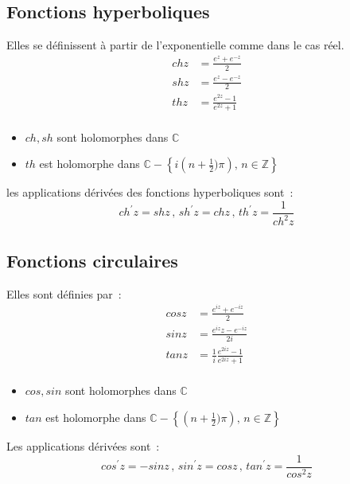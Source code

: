 \subsection{Fonctions hyperboliques}
Elles se définissent à partir de l'exponentielle comme dans le cas
réel.
\begin{align*}
ch z &= \frac{e^z + e^{-z}}{2} \\
sh z &= \frac{e^z - e^{-z}}{2} \\
th z &= \frac{e^{2z} - 1}{e^{2z} + 1} \\
\end{align*}
\begin{itemize}
\item $ch, sh$ sont holomorphes dans $\mathbb{C}$ 
\item $th$ est holomorphe dans
$\mathbb{C} - \left \{ i \left (n+\frac{1}{2})\pi \right ) , \, n \in
  \mathbb{Z} \right \}$
\end{itemize} 
les applications dérivées des fonctions hyperboliques sont~:
\[
ch^\prime z = sh z \, , \, sh^\prime z = ch z \, , \, 
th^\prime z = \frac{1}{ch^2 z}
\]
\subsection{Fonctions circulaires}
Elles sont définies par~:
\begin{align*}
cos z &= \frac{e^{iz} + e^{-iz}}{2} \\
sin z &= \frac{e^{iz}z - e^{-iz}}{2i} \\
tan z &= \frac{1}{i}\frac{e^{2iz} - 1}{e^{2iz} + 1} \\
\end{align*}
\begin{itemize}
\item $cos,sin$ sont holomorphes dans $\mathbb{C}$
\item $tan$ est holomorphe
dans $\mathbb{C} - \left \{ \left (n+\frac{1}{2})\pi \right ) , \, n \in
  \mathbb{Z} \right \}$
\end{itemize}
Les applications dérivées sont~:
\[
cos^\prime z = -sin z \, , \, sin^\prime z = cos z \, , \, 
tan^\prime z = \frac{1}{cos^2 z}
\]
